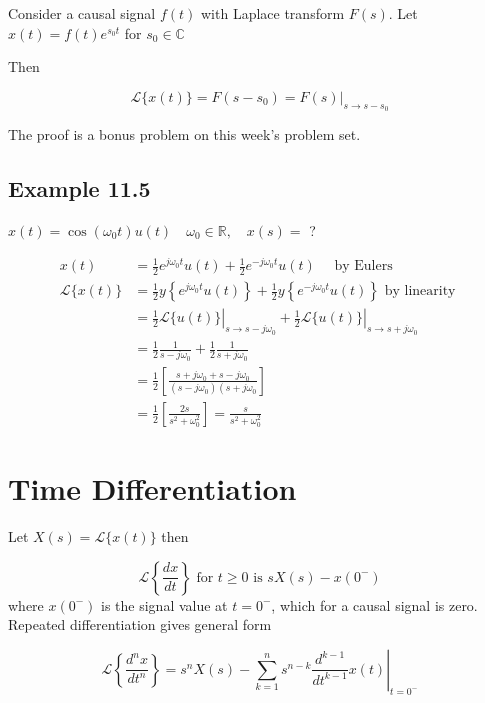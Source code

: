\documentclass{article}
\begin{document}
Consider a causal signal $f(t)$ with Laplace transform $F(s)$. Let $x(t)=f(t) e^{s_{0} t}$ for $s_{0} \in \mathbb{C}$

Then

\[
\mathcal{L}\{x(t)\}=F\left(s-s_{0}\right)=\left.F(s)\right|_{s \rightarrow s-s_{0}}
\]

The proof is a bonus problem on this week's problem set.

\subsection{Example 11.5}

$x(t)=\cos \left(\omega_{0} t\right) u(t) \quad \omega_{0} \in \mathbb{R}, \quad x(s)=$ ?

$$
\begin{aligned}
x(t) & =\frac{1}{2} e^{j \omega_{0} t} u(t)+\frac{1}{2} e^{-j \omega_{0} t} u(t) \quad \text { by Eulers } \\
\mathcal{L}\{x(t)\} & =\frac{1}{2} y\left\{e^{j \omega_{0} t} u(t)\right\}+\frac{1}{2} y\left\{e^{-j \omega_{0} t} u(t)\right\} \text { by linearity } \\
& =\left.\frac{1}{2} \mathcal{L}\{u(t)\}\right|_{s \rightarrow s-j \omega_{0}}+\left.\frac{1}{2} \mathcal{L}\{u(t)\}\right|_{s \rightarrow s + j\omega_{0}} \\
& =\frac{1}{2} \frac{1}{s-j \omega_{0}}+\frac{1}{2} \frac{1}{s+j \omega_{0}} \\
& =\frac{1}{2}\left[\frac{s+j \omega_{0}+s-j \omega_{0}}{\left(s-j \omega_{0}\right)\left(s+j \omega_{0}\right.}\right] \\
& =\frac{1}{2}\left[\frac{2 s}{s^{2}+\omega_{0}^{2}}\right]=\frac{s}{s^{2}+\omega_{0}^{2}}
\end{aligned}
$$

\section{Time Differentiation}

Let $X(s)=\mathcal{L}\{x(t)\}$ then

$$
\mathcal{L}\left\{\frac{d x}{d t}\right\} \text { for } t \geq 0 \text { is } s X(s)-x\left(0^{-}\right)
$$
where $x\left(0^{-}\right)$ is the signal value at $t=0^{-}$, which for a causal signal is zero. Repeated differentiation gives general form

$$
\mathcal{L}\left\{\frac{d^{n} x}{d t^{n}}\right\}=\left. s^{n} X(s)-\sum\limits_{k=1}^{n} s^{n-k} \frac{d^{k-1}}{d t^{k-1}} x(t) \right|_{t=0^{-}}
$$
\end{document}
